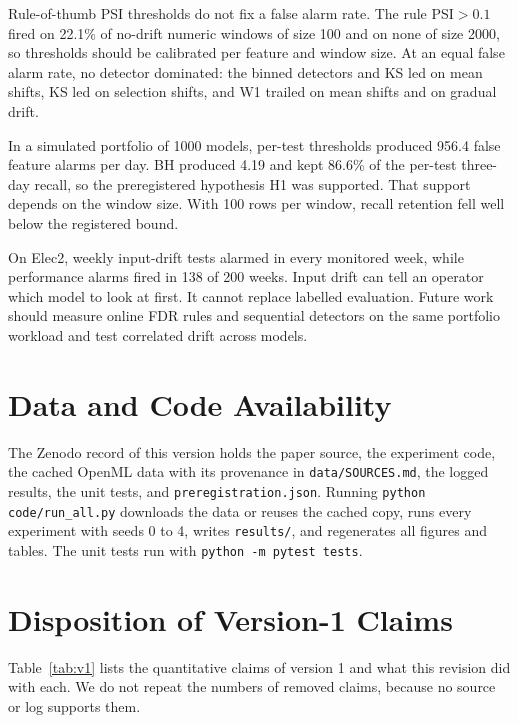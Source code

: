 \documentclass[journal]{IEEEtran}
\begin{document}
Rule-of-thumb PSI thresholds do not fix a false alarm rate. The rule PSI${}>0.1$ fired on 22.1\% of no-drift numeric windows of size 100 and on none of size 2000, so thresholds should be calibrated per feature and window size. At an equal false alarm rate, no detector dominated: the binned detectors and KS led on mean shifts, KS led on selection shifts, and W1 trailed on mean shifts and on gradual drift.

In a simulated portfolio of 1000 models, per-test thresholds produced 956.4 false feature alarms per day. BH produced 4.19 and kept 86.6\% of the per-test three-day recall, so the preregistered hypothesis H1 was supported. That support depends on the window size. With 100 rows per window, recall retention fell well below the registered bound.

On Elec2, weekly input-drift tests alarmed in every monitored week, while performance alarms fired in 138 of 200 weeks. Input drift can tell an operator which model to look at first. It cannot replace labelled evaluation. Future work should measure online FDR rules and sequential detectors on the same portfolio workload and test correlated drift across models.

\section*{Data and Code Availability}
The Zenodo record of this version holds the paper source, the experiment code, the cached OpenML data with its provenance in \texttt{data/SOURCES.md}, the logged results, the unit tests, and \texttt{preregistration.json}. Running \texttt{python code/run\_all.py} downloads the data or reuses the cached copy, runs every experiment with seeds 0 to 4, writes \texttt{results/}, and regenerates all figures and tables. The unit tests run with \texttt{python -m pytest tests}.

\appendices
\section{Disposition of Version-1 Claims}
\label{app:v1}

Table~\ref{tab:v1} lists the quantitative claims of version 1 and what this revision did with each. We do not repeat the numbers of removed claims, because no source or log supports them.
\end{document}
